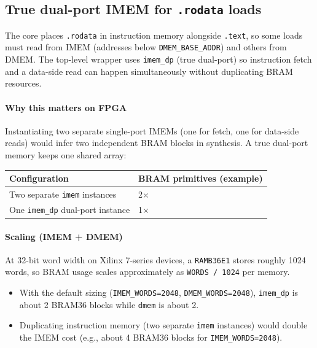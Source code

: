 \subsection{True dual-port IMEM for \texttt{.rodata} loads}
The core places \texttt{.rodata} in instruction memory alongside \texttt{.text},
so some loads must read from IMEM (addresses below \texttt{DMEM\_BASE\_ADDR}) and
others from DMEM. The top-level wrapper uses \texttt{imem\_dp} (true dual-port)
so instruction fetch and a data-side read can happen simultaneously without
duplicating BRAM resources.

\paragraph{Why this matters on FPGA}
Instantiating two separate single-port IMEMs (one for fetch, one for data-side
reads) would infer two independent BRAM blocks in synthesis. A true dual-port
memory keeps one shared array:

\begin{center}
\small
\begin{tabular}{@{}p{}p{}@{}}
\toprule
Configuration & BRAM primitives (example) \\
\midrule
Two separate \texttt{imem} instances & 2$\times$ \\
One \texttt{imem\_dp} dual-port instance & 1$\times$ \\
\bottomrule
\end{tabular}
\end{center}
\normalsize

\paragraph{Scaling (IMEM + DMEM)}
At 32-bit word width on Xilinx 7-series devices, a \texttt{RAMB36E1} stores
roughly 1024 words, so BRAM usage scales approximately as
\texttt{WORDS / 1024} per memory.
\begin{itemize}[leftmargin=*]
  \item With the default sizing (\texttt{IMEM\_WORDS=2048},
        \texttt{DMEM\_WORDS=2048}), \texttt{imem\_dp} is about 2 BRAM36 blocks
        while \texttt{dmem} is about 2.
  \item Duplicating instruction memory (two separate \texttt{imem} instances)
        would double the IMEM cost (e.g., about 4 BRAM36 blocks for
        \texttt{IMEM\_WORDS=2048}).
\end{itemize}

